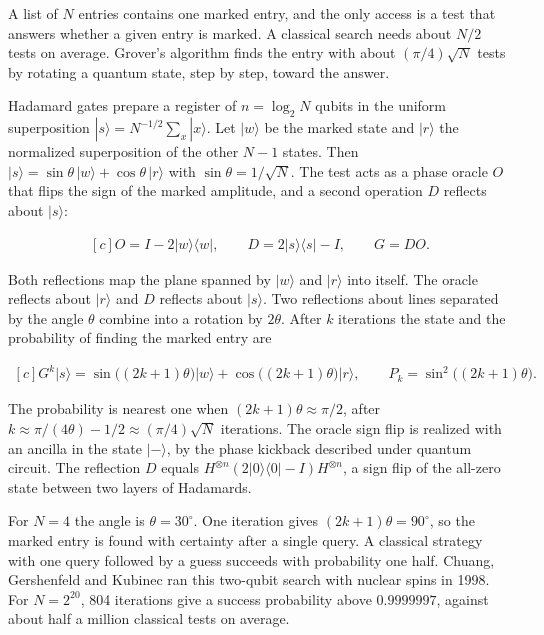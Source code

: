 \documentclass[11pt,oneside]{book}
\newenvironment{centeredalign}{\[\begin{gathered}[c]}{\end{gathered}\]}
\begin{document}
A list of \(N\) entries contains one marked entry, and the only access is a test that answers whether a given entry is marked. A classical search needs about \(N/2\) tests on average. Grover's algorithm finds the entry with about \((\pi/4)\sqrt N\) tests by rotating a quantum state, step by step, toward the answer.

Hadamard gates prepare a register of \(n=\log_2N\) qubits in the uniform superposition \(|s\rangle=N^{-1/2}\sum_x|x\rangle\). Let \(|w\rangle\) be the marked state and \(|r\rangle\) the normalized superposition of the other \(N-1\) states. Then \(|s\rangle=\sin\theta\,|w\rangle+\cos\theta\,|r\rangle\) with \(\sin\theta=1/\sqrt N\). The test acts as a phase oracle \(O\) that flips the sign of the marked amplitude, and a second operation \(D\) reflects about \(|s\rangle\):

\begin{centeredalign}
O=I-2|w\rangle\langle w|,\qquad D=2|s\rangle\langle s|-I,\qquad G=DO.
\end{centeredalign}

Both reflections map the plane spanned by \(|w\rangle\) and \(|r\rangle\) into itself. The oracle reflects about \(|r\rangle\) and \(D\) reflects about \(|s\rangle\). Two reflections about lines separated by the angle \(\theta\) combine into a rotation by \(2\theta\). After \(k\) iterations the state and the probability of finding the marked entry are

\begin{centeredalign}
G^k|s\rangle=\sin\big((2k+1)\theta\big)|w\rangle+\cos\big((2k+1)\theta\big)|r\rangle,\qquad
P_k=\sin^2\big((2k+1)\theta\big).
\end{centeredalign}

The probability is nearest one when \((2k+1)\theta\approx\pi/2\), after \(k\approx\pi/(4\theta)-1/2\approx(\pi/4)\sqrt N\) iterations. The oracle sign flip is realized with an ancilla in the state \(|-\rangle\), by the phase kickback described under quantum circuit. The reflection \(D\) equals \(H^{\otimes n}(2|0\rangle\langle0|-I)H^{\otimes n}\), a sign flip of the all-zero state between two layers of Hadamards.

For \(N=4\) the angle is \(\theta=30^\circ\). One iteration gives \((2k+1)\theta=90^\circ\), so the marked entry is found with certainty after a single query. A classical strategy with one query followed by a guess succeeds with probability one half. Chuang, Gershenfeld and Kubinec ran this two-qubit search with nuclear spins in 1998. For \(N=2^{20}\), 804 iterations give a success probability above \(0.9999997\), against about half a million classical tests on average.
\end{document}
